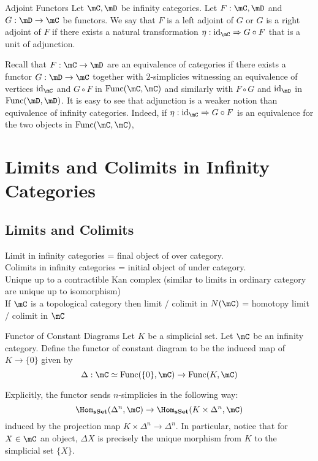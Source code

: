 \documentclass[a4paper]{article}
\begin{document}
\begin{defn}{Adjoint Functors}{} Let $\mC,\mD$ be infinity categories. Let $F:\mC,\mD$ and $G:\mD\to\mC$ be functors. We say that $F$ is a left adjoint of $G$ or $G$ is a right adjoint of $F$ if there exists a natural transformation $\eta:\text{id}_\mC\Rightarrow G\circ F$ that is a unit of adjunction. 
\end{defn}

Recall that $F:\mC\to\mD$ are an equivalence of categories if there exists a functor $G:\mD\to\mC$ together with $2$-simplicies witnessing an equivalence of vertices $\text{id}_\mC$ and $G\circ F$ in $\text{Func}(\mC,\mC)$ and similarly with $F\circ G$ and $\text{id}_\mD$ in $\text{Func}(\mD,\mD)$. It is easy to see that adjunction is a weaker notion than equivalence of infinity categories. Indeed, if $\eta:\text{id}_\mC\Rightarrow G\circ F$ is an equivalence for the two objects in $\text{Func}(\mC,\mC)$, 

\pagebreak
\section{Limits and Colimits in Infinity Categories}
\subsection{Limits and Colimits}
Limit in infinity categories = final object of over category. \\
Colimits in infinity categories = initial object of under category. \\

Unique up to a contractible Kan complex (similar to limits in ordinary category are unique up to isomorphism)\\

If $\mC$ is a topological category then limit / colimit in $N(\mC)$ = homotopy limit / colimit in $\mC$






\begin{defn}{Functor of Constant Diagrams}{} Let $K$ be a simplicial set. Let $\mC$ be an infinity category. Define the functor of constant diagram to be the induced map of $K\to\{0\}$ given by $$\Delta:\mC\simeq\text{Func}(\{0\},\mC)\to\text{Func}(K,\mC)$$
\end{defn}

Explicitly, the functor sends $n$-simplicies in the following way: $$\Hom_\bold{sSet}(\Delta^n,\mC)\to\Hom_\bold{sSet}(K\times\Delta^n,\mC)$$ induced by the projection map $K\times\Delta^n\to\Delta^n$. In particular, notice that for $X\in\mC$ an object, $\Delta X$ is precisely the unique morphism from $K$ to the simplicial set $\{X\}$. 
\end{document}
